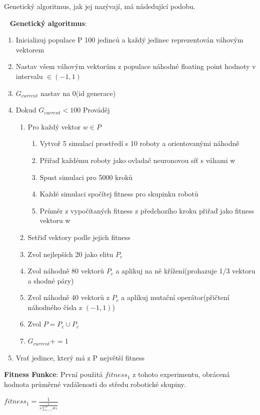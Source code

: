 Genetický algoritmus, jak jej nazývají, má následující podobu.\par 
\ \newline
\textbf{Genetický algoritmus}:
\begin{enumerate}
    \item Inicializuj populace P 100 jedinců a každý jedinec reprezentován váhovým vektorem
    \item Nastav všem váhovým vektorům z populace náhodné floating point hodnoty v intervalu $\in (-1,1)$ 
    \item $G_{current}$ nastav na 0(id generace)
    \item Dokud $G_{current} < 100$ Prováděj \begin{enumerate}
        \item Pro každý vektor $w \in P$ \begin{enumerate}
            \item Vytvoř 5 simulací prostředí s 10 roboty a orientovanými náhodně
            \item Přiřaď každému roboty jako ovladač neuronovou síť s váhami w
            \item Spust simulaci pro 5000 kroků
            \item Každé simulaci spočítej fitness pro skupinku robotů
            \item Průměr z vypočítaných fitness z předchozího kroku přiřaď jako fitness vektoru w
        \end{enumerate} 
    \item Setřiď vektory podle jejich fitness 
    \item Zvol nejlepších 20 jako elitu $P_{e}$
    \item Zvol náhodně 80 vektorů $P_c$ a aplikuj na ně křížení(prohazuje 1/3 vektoru a shodné páry)
    \item Zvol náhodně 40 vektorů z $P_c$ a aplikuj mutační operátor(přičtení náhodného čísla z $(-1,1)$)
    \item Zvol $P = P_c \cup P_e$
    \item $G_{current} += 1$
    \end{enumerate} 
    \item Vrať jedince, který má z P největší fitness    
\end{enumerate} 
\par 
\textbf{Fitness Funkce}: První použitá $fitness_1$ z tohoto experimentu, obrácená hodnota průměrné vzdálenosti do středu robotické skupiny. 
\par
\begin{center}
\textbf{$fitness_1 = \frac{1}{\frac{1}{n\sum\limits_{r=1}^{n} d{rc}}} $}
\end{center}
